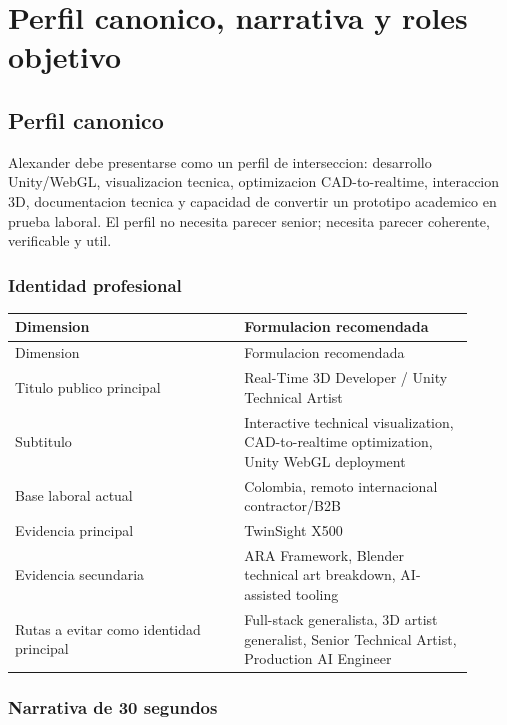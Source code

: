 \chapter{Perfil canonico, narrativa y roles objetivo}

\section{Perfil canonico}


Alexander debe presentarse como un perfil de interseccion: desarrollo Unity/WebGL, visualizacion tecnica, optimizacion CAD-to-realtime, interaccion 3D, documentacion tecnica y capacidad de convertir un prototipo academico en prueba laboral. El perfil no necesita parecer senior; necesita parecer coherente, verificable y util.


\subsection{Identidad profesional}


\begin{center}
\scriptsize
\begin{longtable}{>{\raggedright\arraybackslash}p{0.455\linewidth} >{\raggedright\arraybackslash}p{0.455\linewidth}}
\toprule
Dimension & Formulacion recomendada \\
\midrule
\endfirsthead
\toprule
Dimension & Formulacion recomendada \\
\midrule
\endhead
Titulo publico principal & Real-Time 3D Developer / Unity Technical Artist \\
Subtitulo & Interactive technical visualization, CAD-to-realtime optimization, Unity WebGL deployment \\
Base laboral actual & Colombia, remoto internacional contractor/B2B \\
Evidencia principal & TwinSight X500 \\
Evidencia secundaria & ARA Framework, Blender technical art breakdown, AI-assisted tooling \\
Rutas a evitar como identidad principal & Full-stack generalista, 3D artist generalist, Senior Technical Artist, Production AI Engineer \\
\bottomrule
\end{longtable}
\end{center}


\subsection{Narrativa de 30 segundos}


